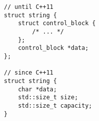 \begin{lstlisting}[title=\href{https://godbolt.org/z/KM5Tvq}{\texttt{godbolt.org/z/KM5Tvq}}]
// until C++11
struct string {
    struct control_block {
        /* ... */
    };
    control_block *data;
};

// since C++11
struct string {
    char *data;
    std::size_t size;
    std::size_t capacity;
}
\end{lstlisting}
